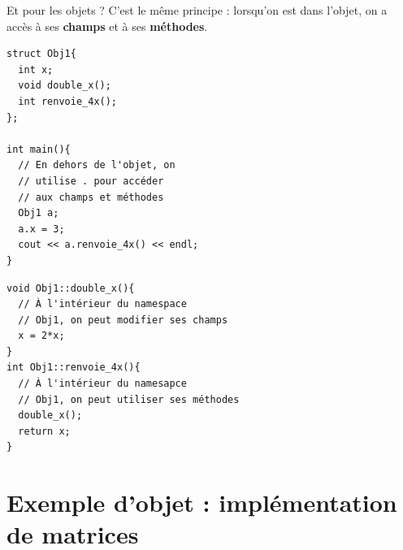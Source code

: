 \begin{frame}[fragile]{Et pour les objets ?}
    C'est le même principe : lorsqu'on est dans l'objet, on a accès à ses \textbf{champs} et à ses \textbf{méthodes}.

\begin{minipage}{0.50\linewidth}
    
        \begin{verbatim}
struct Obj1{
  int x;
  void double_x();
  int renvoie_4x();
};

int main(){
  // En dehors de l'objet, on
  // utilise . pour accéder
  // aux champs et méthodes
  Obj1 a;
  a.x = 3;
  cout << a.renvoie_4x() << endl;
}
        \end{verbatim}
    
\end{minipage}
\hfill
\begin{minipage}{0.48\linewidth}
        \begin{verbatim}
void Obj1::double_x(){
  // À l'intérieur du namespace
  // Obj1, on peut modifier ses champs
  x = 2*x;
}
int Obj1::renvoie_4x(){
  // À l'intérieur du namesapce
  // Obj1, on peut utiliser ses méthodes
  double_x();
  return x;
}
        \end{verbatim}
\end{minipage}
\end{frame}

\section{Exemple d'objet : implémentation de matrices}

